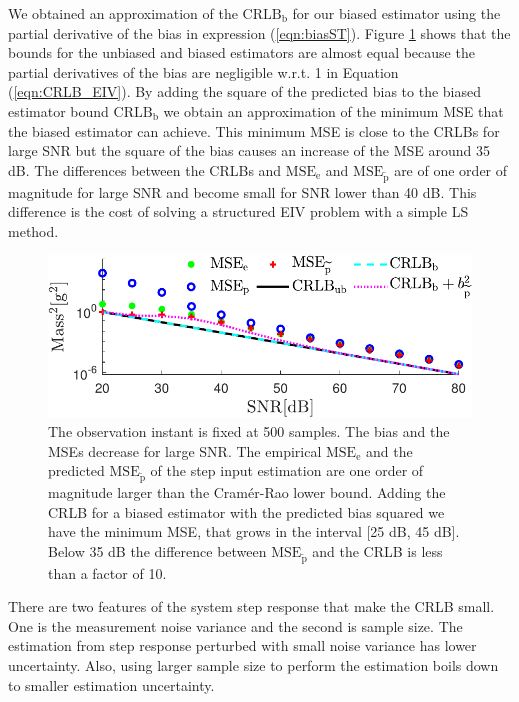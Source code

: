 We obtained an approximation of the $\mathrm{CRLB}_{\mathrm{b}}$ for our biased estimator using the partial derivative of the bias in expression (\ref{eqn:biasST}).
Figure \ref{fig:MSE_CRLB_str_exp} shows that the bounds for the unbiased and biased estimators are almost equal because the partial derivatives of the bias are negligible w.r.t. 1 in Equation (\ref{eqn:CRLB_EIV}).
By adding the square of the predicted bias to the biased estimator bound $\mathrm{CRLB_{b}}$ we obtain an approximation of the minimum MSE that the biased estimator can achieve.
This minimum MSE is close to the CRLBs for large SNR but the square of the bias causes an increase of the MSE around 35 dB.
The differences between the CRLBs and $\mathrm{MSE}_\mathrm{e}$ and $\mathrm{MSE}_{\widetilde{\mathrm{p}}}$ are of one order of magnitude for large SNR and become small for SNR lower than 40 dB.
This difference is the cost of solving a structured EIV problem with a simple LS method.


\begin{figure}[!htb]
\centering
\includegraphics[width=0.69\columnwidth]{./ChapterExperimentalValidation/fig/Fig_3.pdf}
\caption{\label{fig:MSE_CRLB_str_exp} The observation instant is fixed at 500 samples.
The bias and the MSEs decrease for large SNR. 
The empirical $\mathrm{MSE_e}$ and the predicted $\mathrm{MSE}_{\widetilde{\mathrm{p}}}$ of the step input estimation are one order of magnitude larger than the Cram\'er-Rao lower bound.
Adding the CRLB for a biased estimator with the predicted bias squared we have the minimum MSE, that grows in the interval [25 dB, 45 dB].
Below 35 dB the difference between $\mathrm{MSE}_{\widetilde{\mathrm{p}}}$ and the CRLB is less than a factor of 10.}
\end{figure}

There are two features of the system step response that make the CRLB small.
One is the measurement noise variance and the second is sample size.
The estimation from step response perturbed with small noise variance has lower uncertainty.
Also, using larger sample size to perform the estimation boils down to smaller estimation uncertainty.

